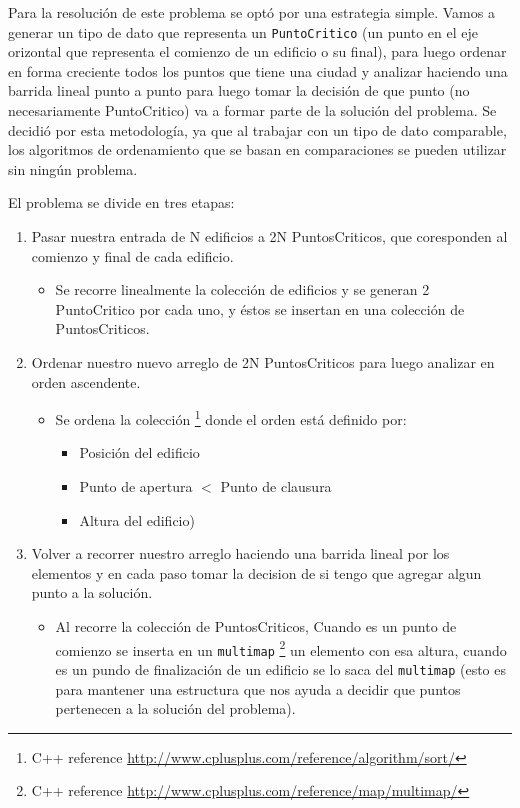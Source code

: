 Para la resolución de este problema se optó por una estrategia simple. Vamos a generar un tipo de dato que representa un \texttt{PuntoCritico} (un punto en el eje orizontal que representa el comienzo de un edificio o su final), para luego ordenar en forma creciente todos los puntos que tiene una ciudad y analizar haciendo una barrida lineal punto a punto para luego tomar la decisi\'on de que punto (no necesariamente PuntoCritico) va a formar parte de la solución del problema.
Se decidió por esta metodología, ya que al trabajar con un tipo de dato comparable, los algoritmos de ordenamiento que se basan en comparaciones se pueden utilizar sin ningún problema.

El problema se divide en tres etapas:

\begin{enumerate}[I]
	\item Pasar nuestra entrada de N edificios a 2N PuntosCriticos, que coresponden al comienzo y final de cada edificio.
		\begin{itemize}
		\item  Se recorre linealmente la colección de edificios y se generan 2 PuntoCritico por cada uno, y \'estos se insertan en una colección de PuntosCriticos.
		\end{itemize}
	\item Ordenar nuestro nuevo arreglo de 2N PuntosCriticos para luego analizar en orden ascendente.
		\begin{itemize}
		\item  Se ordena la colecci\'on \footnote{C++ reference \url{http://www.cplusplus.com/reference/algorithm/sort/}} donde el orden está definido por:  
			\begin{itemize}
				\item Posici\'on del edificio
				\item Punto de apertura $<$ Punto de clausura
				\item Altura del edificio)
			\end{itemize}
		\end{itemize}
	\item Volver a recorrer nuestro arreglo haciendo una barrida lineal por los elementos y en cada paso tomar la decision de si tengo que agregar algun punto a la soluci\'on.
	\begin{itemize}
		\item  Al recorre la colección de PuntosCriticos, Cuando es un punto de comienzo se inserta en un \texttt{multimap} \footnote{C++ reference \url{http://www.cplusplus.com/reference/map/multimap/}}  un elemento con esa altura, cuando es un pundo de finalizaci\'on de un edificio se lo saca del \texttt{multimap} (esto es para mantener una estructura que nos ayuda a decidir que puntos pertenecen a la soluci\'on del problema).
		\end{itemize}
\end{enumerate}

